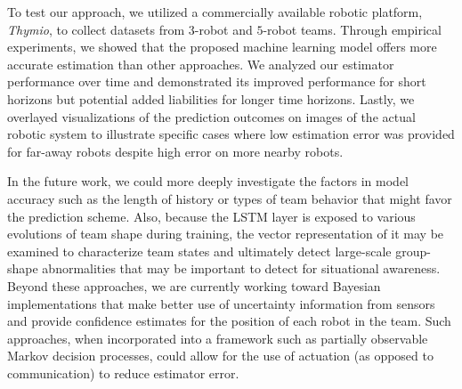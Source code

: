 \documentclass[letterpaper, 10 pt, conference]{ieeeconf}  %
\begin{document}
    To test our approach, we utilized a commercially available robotic
    platform, \emph{Thymio}, to collect datasets from $3$-robot and
    $5$-robot teams. Through empirical experiments, we showed that the
    proposed machine learning model offers more accurate estimation than
    other approaches. We analyzed our estimator performance over time
    and demonstrated its improved performance for short horizons but
    potential added liabilities for longer time horizons. Lastly, we
    overlayed visualizations of the prediction outcomes on images of the
    actual robotic system to illustrate specific cases where low
    estimation error was provided for far-away robots despite high error
    on more nearby robots.

    In the future work, we could more deeply investigate the factors in
    model accuracy such as the length of history or types of team
    behavior that might favor the prediction scheme. Also, because the
    LSTM layer is exposed to various evolutions of team shape during
    training, the vector representation of it may be examined to
    characterize team states and ultimately detect large-scale
    group-shape abnormalities that may be important to detect for
    situational awareness. 
    Beyond these approaches, we are currently
    working toward Bayesian implementations that make better use of
    uncertainty information from sensors and provide confidence
    estimates for the position of each robot in the team. Such
    approaches, when incorporated into a framework such as partially
    observable Markov decision processes, could allow for the use of
    actuation (as opposed to communication) to reduce estimator
    error.

{\small
	
	
}
\end{document}
